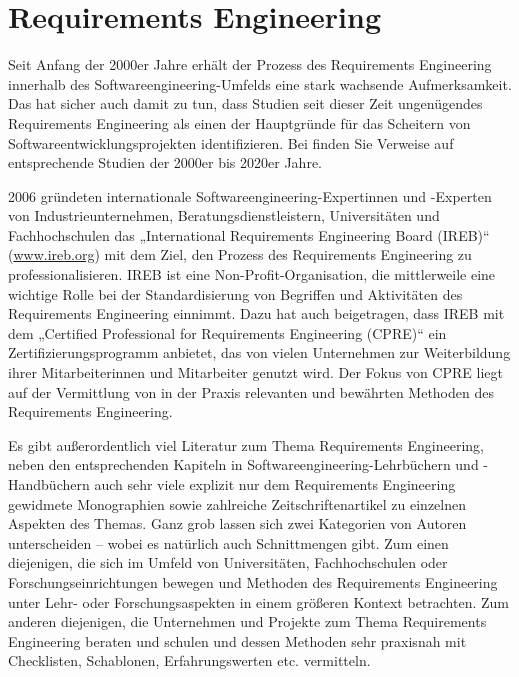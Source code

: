 \cleardoublepage
\chapter{Requirements Engineering}
\label{sec:Kap-6}

Seit Anfang der 2000er Jahre erhält der Prozess des Requirements Engineering 
innerhalb des Softwareengineering-Umfelds eine stark wachsende Aufmerksamkeit. Das hat sicher auch damit zu tun, dass Studien seit dieser Zeit ungenügendes Require\-ments Engineering als einen der Hauptgründe für das Scheitern von Software\-entwicklungs\-projekten identifizieren. Bei \cite[4]{ebe22} finden Sie Verweise auf entsprechende Studien der 2000er bis 2020er Jahre. 

\label{sec:Kap-6:IREB}
2006 gründeten internationale Softwareengineering-Expertinnen und -Experten von Industrieunternehmen, Beratungsdienstleistern, Universitäten und Fachhochschulen das „International Requirements Engineering Board (IREB)“ (\href{https://www.ireb.org}{www.ireb.org}) mit dem Ziel, den Prozess des Requirements Engineering zu professionalisieren. IREB ist eine Non-Profit-Organisation, die mittlerweile eine wichtige Rolle bei der Standardisierung von Begriffen und Aktivitäten des Requirements Engineering einnimmt. Dazu hat auch beigetragen, dass IREB mit dem „Certified Professional for Require\-ments Engineering \mbox{(CPRE)}“ ein Zertifizierungsprogramm anbietet, das von vielen Unternehmen zur Weiterbildung ihrer Mitarbeiterinnen und Mitarbeiter genutzt wird. Der Fokus von CPRE liegt auf der Vermittlung von in der Praxis relevanten und bewährten Methoden des Requirements Engineering.

Es gibt außerordentlich viel Literatur 
zum Thema Requirements Engineering, neben den entsprechenden Kapiteln in Softwareengineering-Lehrbüchern und -Handbüchern auch sehr viele explizit nur dem Requirements Engineering gewidmete Mono\-graphien sowie zahlreiche Zeitschriftenartikel zu einzelnen Aspekten des Themas. Ganz grob lassen sich zwei Kategorien von Autoren unterscheiden -- wobei es natürlich auch Schnittmengen gibt. Zum einen diejenigen, die sich im Umfeld von Universitäten, Fachhochschulen oder Forschungseinrichtungen bewegen und Methoden des Requirements Engineering unter Lehr- oder Forschungsaspekten in einem größeren Kontext betrachten. Zum anderen diejenigen, die Unternehmen und Projekte zum Thema Require\-ments Engineering beraten und schulen und dessen Methoden sehr praxisnah mit Checklisten, Schablonen, Erfahrungswerten etc. vermitteln.

